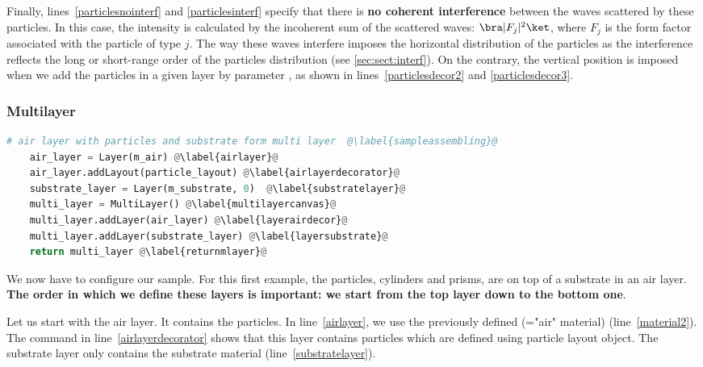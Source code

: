 \noindent Finally, lines~\ref{particlesnointerf} and
\ref{particlesinterf} specify that there is \textbf{no coherent interference} between
the waves scattered by these particles. In this case, the intensity is calculated by
the incoherent sum of the scattered waves: $\bra |F_j|^2\ket$,
where $F_j$ is the form factor associated with the particle of type $j$.  The way these waves
interfere imposes the horizontal distribution of
the particles as
the interference reflects the long or short-range order of the
particles distribution (see  \cref{sec:sect:interf}). On the contrary, the vertical position is
imposed when we add the particles in a given layer by parameter , as shown in lines~\ref{particlesdecor2} and \ref{particlesdecor3}.

\subsubsection{Multilayer}
\begin{lstlisting}[language=python, style=eclipseboxed,name=ex1,nolol]
# air layer with particles and substrate form multi layer  @\label{sampleassembling}@
    air_layer = Layer(m_air) @\label{airlayer}@
    air_layer.addLayout(particle_layout) @\label{airlayerdecorator}@
    substrate_layer = Layer(m_substrate, 0)  @\label{substratelayer}@
    multi_layer = MultiLayer() @\label{multilayercanvas}@
    multi_layer.addLayer(air_layer) @\label{layerairdecor}@
    multi_layer.addLayer(substrate_layer) @\label{layersubstrate}@
    return multi_layer @\label{returnmlayer}@
\end{lstlisting}
We now have to configure our sample. For this first example,
the particles, \idest  cylinders and prisms, are on top of a substrate in an
air layer. \textbf{The order in which we define these layers is important: we
start from the top layer down to the bottom one}.

Let us start with the air layer. It contains the particles. In
line~\ref{airlayer}, we use the previously defined 
(="air" material) (line~\ref{material2}). The command in line~\ref{airlayerdecorator} shows that this layer contains particles
which are defined using particle layout object. The substrate layer
only contains the substrate material (line~\ref{substratelayer}).

